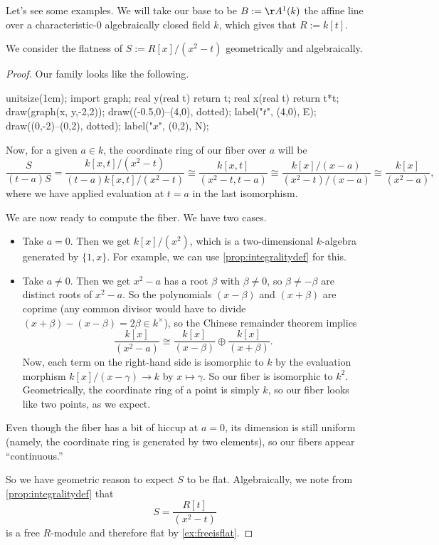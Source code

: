 Let's see some examples. We will take our base to be $B:=\AA^1(k)$ the affine line over a characteristic-$0$ algebraically closed field $k$, which gives that $R:=k[t]$.
\begin{exe}
	We consider the flatness of $S:=R[x]/\left(x^2-t\right)$ geometrically and algebraically.
\end{exe}
\begin{proof}
	Our family looks like the following.
	\begin{center}
		\begin{asy}
			unitsize(1cm);
			import graph;
			real y(real t)
			{
				return t;
			}
			real x(real t)
			{
				return t*t;
			}
			draw(graph(x, y,-2,2));
			draw((-0.5,0)--(4,0), dotted); label("$t$", (4,0), E);
			draw((0,-2)--(0,2), dotted); label("$x$", (0,2), N);
		\end{asy}
	\end{center}
	Now, for a given $a\in k$, the coordinate ring of our fiber over $a$ will be
	\[\frac S{(t-a)S}=\frac{k[x,t]/\left(x^2-t\right)}{(t-a)k[x,t]/\left(x^2-t\right)}\cong\frac{k[x,t]}{\left(x^2-t,t-a\right)}\cong\frac{k[x]/(x-a)}{\left(x^2-t\right)/(x-a)}\cong\frac{k[x]}{\left(x^2-a\right)},\]
	where we have applied evaluation at $t=a$ in the last isomorphism.

	We are now ready to compute the fiber. We have two cases.
	\begin{itemize}
		\item Take $a=0$. Then we get $k[x]/\left(x^2\right)$, which is a two-dimensional $k$-algebra generated by $\{1,x\}$. For example, we can use \autoref{prop:integralitydef} for this.
		\item Take $a\ne0$. Then we get $x^2-a$ has a root $\beta$ with $\beta\ne0$, so $\beta\ne-\beta$ are distinct roots of $x^2-a$. So the polynomials $(x-\beta)$ and $(x+\beta)$ are coprime (any common divisor would have to divide $(x+\beta)-(x-\beta)=2\beta\in k^\times$), so the Chinese remainder theorem implies
		\[\frac{k[x]}{\left(x^2-a\right)}\cong\frac{k[x]}{(x-\beta)}\oplus\frac{k[x]}{(x+\beta)}.\]
		Now, each term on the right-hand side is isomorphic to $k$ by the evaluation morphism $k[x]/(x-\gamma)\to k$ by $x\mapsto\gamma$. So our fiber is isomorphic to $k^2$. Geometrically, the coordinate ring of a point is simply $k$, so our fiber looks like two points, as we expect.
	\end{itemize}
	Even though the fiber has a bit of hiccup at $a=0$, its dimension is still uniform (namely, the coordinate ring is generated by two elements), so our fibers appear ``continuous.''

	So we have geometric reason to expect $S$ to be flat. Algebraically, we note from \autoref{prop:integralitydef} that
	\[S=\frac{R[t]}{\left(x^2-t\right)}\]
	is a free $R$-module and therefore flat by \autoref{ex:freeisflat}.
\end{proof}

